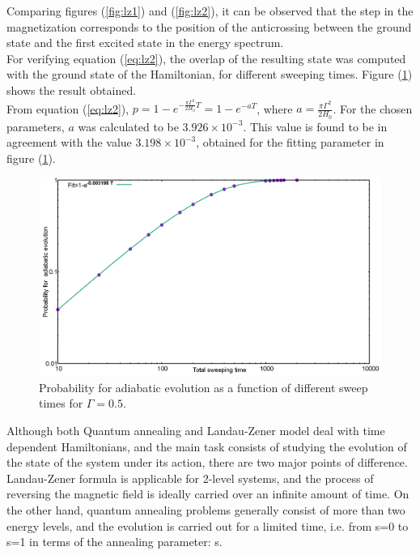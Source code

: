 \documentclass[12]{article}
\begin{document}
Comparing figures (\ref{fig:lz1}) and (\ref{fig:lz2}), it can be observed that the step in the magnetization corresponds to the position of the anticrossing between the ground state and the first excited state in the energy spectrum.\\

For verifying equation (\ref{eq:lz2}), the overlap of the resulting state was computed with the ground state of the Hamiltonian, for different sweeping times. Figure (\ref{fig:lz3}) shows the result obtained.\\

From equation (\ref{eq:lz2}), $p=1-e^{-\frac{\pi \Gamma^2}{2H_0} T}=1-e^{-aT}$, where $a=\frac{\pi \Gamma^2}{2H_0}$. For the chosen parameters, $a$ was calculated to be $3.926 \times 10^{-3}$. This value is found to be in agreement with the value $3.198 \times 10^{-3}$, obtained for the fitting parameter in figure (\ref{fig:lz3}).

\begin{figure}[H]
\centering 
\includegraphics[scale=0.3]{Prob_1spin_H100.png}
\caption{Probability for adiabatic evolution as a function of different sweep times for $\Gamma=0.5$.}
\label{fig:lz3}
\end{figure}



Although both Quantum annealing and Landau-Zener model deal with time dependent Hamiltonians, and the main task consists of studying the evolution of the state of the system under its action, there are two major points of difference. Landau-Zener formula is applicable for 2-level systems, and the process of reversing the magnetic field is ideally carried over an infinite amount of time. On the other hand, quantum annealing problems generally consist of more than two energy levels, and the evolution is carried out for a limited time, i.e. from s=0 to s=1 in terms of the annealing parameter: s.
\end{document}
